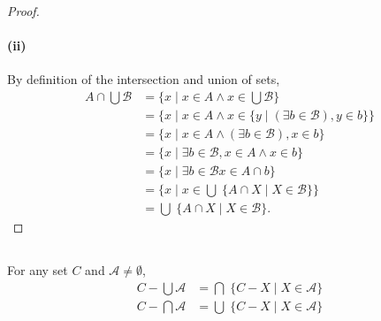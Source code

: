 \documentclass{report}
\begin{document}
\begin{proof}
  \paragraph{(ii)}%

    By definition of the intersection and union of sets,
      \begin{align*}
        A \cap \bigcup \mathscr{B}
          & = \{ x \mid x \in A \land x \in \bigcup \mathscr{B} \} \\
          & = \{ x \mid x \in A \land
            x \in \{ y \mid (\exists b \in \mathscr{B}), y \in b \}\} \\
          & = \{ x \mid x \in A \land (\exists b \in \mathscr{B}), x \in b \} \\
          & = \{ x \mid \exists b \in \mathscr{B}, x \in A \land x \in b \} \\
          & = \{ x \mid \exists b \in \mathscr{B} x \in A \cap b \} \\
          & = \{ x \mid
            x \in \bigcup\; \{ A \cap X \mid X \in \mathscr{B} \}\} \\
          & = \bigcup\; \{ A \cap X \mid X \in \mathscr{B} \}.
      \end{align*}

\end{proof}

\subsection{}%

For any set $C$ and $\mathscr{A} \neq \emptyset$,
  \begin{align*}
    C - \bigcup \mathscr{A} & = \bigcap\; \{ C - X \mid X \in \mathscr{A} \} \\
    C - \bigcap \mathscr{A} & = \bigcup\; \{ C - X \mid X \in \mathscr{A} \}
  \end{align*}
\end{document}
